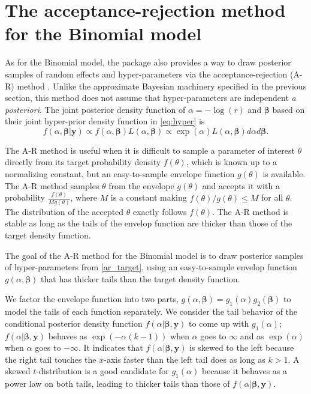 \documentclass[article]{jss}
\begin{document}
\section[Estimation]{The acceptance-rejection method for the Binomial model}\label{sec_accept}
As for the Binomial model, the package  also provides a way to draw  posterior samples of random effects and hyper-parameters via the acceptance-rejection (A-R) method \citep{robert2013monte}. Unlike the approximate Bayesian machinery specified in the previous section, this method does not assume that hyper-parameters are independent \emph{a posteriori}. The joint posterior density function of $\alpha=-\log(r)$ and $\boldsymbol{\beta}$ based on their joint hyper-prior density function in  \eqref{eq:hyper} is 
\begin{equation}\label{ar_target}
f(\alpha, \boldsymbol{\beta} \vert \boldsymbol{y})\propto f(\alpha, \boldsymbol{\beta})L(\alpha, \boldsymbol{\beta})\propto \exp(\alpha)L(\alpha, \boldsymbol{\beta})d\alpha d\boldsymbol{\beta}.
\end{equation}

The A-R method  is useful when it is difficult to sample a parameter of interest $\theta$ directly from its target probability density $f(\theta)$, which is known up to a normalizing constant, but an easy-to-sample envelope function $g(\theta)$ is available. The A-R method samples $\theta$  from the envelope $g(\theta)$ and accepts it with a probability $\frac{f(\theta)}{Mg(\theta)}$, where $M$ is a constant making $f(\theta)/g(\theta)\le M$ for all $\theta$. The distribution of the accepted $\theta$ exactly follows $f(\theta)$. The A-R method is stable as long as the tails of the envelop function are thicker than those of the target density function. 

The goal of the A-R method  for the  Binomial model is to  draw  posterior samples of hyper-parameters from \eqref{ar_target}, using an easy-to-sample envelop function $g(\alpha, \boldsymbol{\beta})$ that has thicker tails than the target density function. 

We factor the envelope function into two parts, $g(\alpha, \boldsymbol{\beta})=g_1(\alpha)g_2(\boldsymbol{\beta})$ to model the tails of each function separately. We consider the tail behavior of the conditional posterior density function $f(\alpha \vert \boldsymbol{\beta},  \boldsymbol{y})$ to come up with $g_1(\alpha)$; $f(\alpha \vert \boldsymbol{\beta},  \boldsymbol{y})$ behaves as $\exp(-\alpha(k-1))$ when $\alpha$ goes to $\infty$ and as $\exp(\alpha)$ when $\alpha$ goes to $-\infty$. It indicates that $f(\alpha \vert \boldsymbol{\beta},  \boldsymbol{y})$ is skewed to the left because the right tail touches the $x$-axis faster than the left tail does as long as $k>1$.  A skewed $t$-distribution  is a good candidate for $g_1(\alpha)$ because it behaves as a power law on both tails, leading to thicker tails than those of $f(\alpha \vert \boldsymbol{\beta},  \boldsymbol{y})$. 
\end{document}
